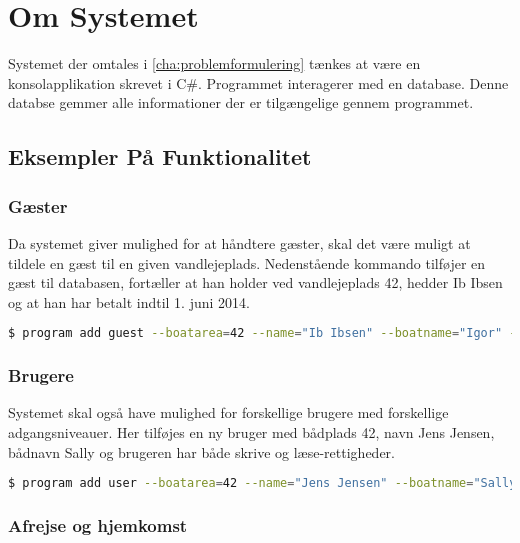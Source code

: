 \section{Om Systemet}
\label{sec:om_systemet}

Systemet der omtales i \cref{cha:problemformulering} tænkes at være en konsolapplikation skrevet i C\#. Programmet interagerer med en database. Denne databse gemmer alle informationer der er tilgængelige gennem programmet.

\subsection{Eksempler På Funktionalitet}
\label{sub:eksempler_p_kommandoer}

\subsubsection{Gæster}
\label{ssub:Gaster}


Da systemet giver mulighed for at håndtere gæster, skal det være muligt at tildele en gæst til en given vandlejeplads. Nedenstående kommando tilføjer en gæst til databasen, fortæller at han holder ved vandlejeplads 42, hedder Ib Ibsen og at han har betalt indtil 1. juni 2014.

\begin{lstlisting}[language=bash, label={lst:add_guest}] 
  $ program add guest --boatarea=42 --name="Ib Ibsen" --boatname="Igor" --paiduntil="1/6/2014" 
\end{lstlisting}

\subsubsection{Brugere}
\label{ssub:brugere}

Systemet skal også have mulighed for forskellige brugere med forskellige adgangsniveauer. Her tilføjes en ny bruger med bådplads 42, navn Jens Jensen, bådnavn Sally og brugeren har både skrive og læse-rettigheder.


\begin{lstlisting}[language=bash, label={lst:add_user}] 
  $ program add user --boatarea=42 --name="Jens Jensen" --boatname="Sally" --access="w,r"
\end{lstlisting}


\subsubsection{Afrejse og hjemkomst}
\label{ssub:Afrejse_og_hjemkomst}

